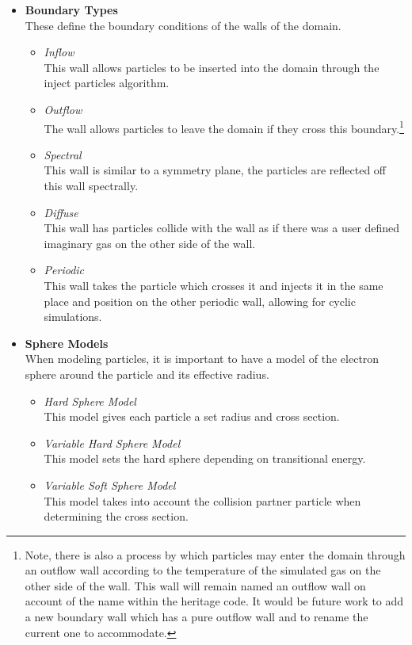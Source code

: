 \begin{itemize}
    \item \textbf{Boundary Types} \\
    These define the boundary conditions of the walls of the domain.
    \begin{itemize}
        \item \textit{Inflow} \\
        This wall allows particles to be inserted into the domain through the inject particles algorithm.
        \item \textit{Outflow} \\
        The wall allows particles to leave the domain if they cross this boundary.\footnote{Note, there is also a process by which particles may enter the domain through an outflow wall according to the temperature of the simulated gas on the other side of the wall. This wall will remain named an outflow wall on account of the name within the heritage code. It would be future work to add a new boundary wall which has a pure outflow wall and to rename the current one to accommodate.}
        \item \textit{Spectral}\\
        This wall is similar to a symmetry plane, the particles are reflected off this wall spectrally.
        \item \textit{Diffuse}\\
        This wall has particles collide with the wall as if there was a user defined imaginary gas on the other side of the wall.
        \item \textit{Periodic} \\
        This wall takes the particle which crosses it and injects it in the same place and position on the other periodic wall, allowing for cyclic simulations.
    \end{itemize}
    
    \item \textbf{Sphere Models}\\
    When modeling particles, it is important to have a model of the electron sphere around the particle and its effective radius.
    \begin{itemize}
        \item \textit{Hard Sphere Model}\\
        This model gives each particle a set radius and cross section.
        \item \textit{Variable Hard Sphere Model}\\
        This model sets the hard sphere depending on transitional energy.
        \item \textit{Variable Soft Sphere Model}\\
        This model takes into account the collision partner particle when determining the cross section.
    \end{itemize}
    

\end{itemize}
